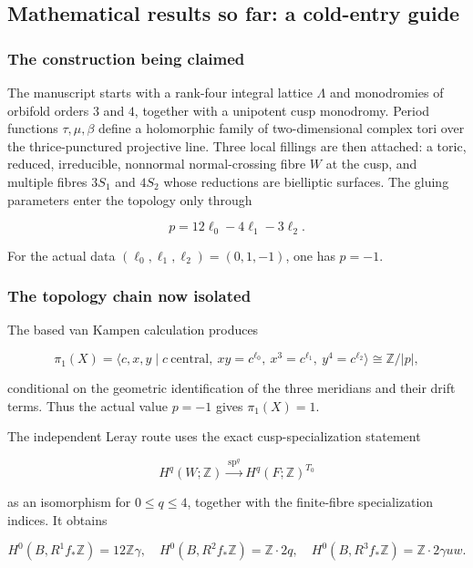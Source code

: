 \documentclass[
  10pt,
  letterpaper,
]{article}
\begin{document}
\subsection{Mathematical results so far: a cold-entry
guide}\label{mathematical-results-so-far-a-cold-entry-guide}

\subsubsection{The construction being
claimed}\label{the-construction-being-claimed}

The manuscript starts with a rank-four integral lattice \(\Lambda\) and
monodromies of orbifold orders \(3\) and \(4\), together with a
unipotent cusp monodromy. Period functions \(\tau,\mu,\beta\) define a
holomorphic family of two-dimensional complex tori over the
thrice-punctured projective line. Three local fillings are then
attached: a toric, reduced, irreducible, nonnormal normal-crossing fibre
\(W\) at the cusp, and multiple fibres \(3S_1\) and \(4S_2\) whose
reductions are bielliptic surfaces. The gluing parameters enter the
topology only through

\[
p=12\ell_0-4\ell_1-3\ell_2.
\]

For the actual data \((\ell_0,\ell_1,\ell_2)=(0,1,-1)\), one has
\(p=-1\).

\subsubsection{The topology chain now
isolated}\label{the-topology-chain-now-isolated}

The based van Kampen calculation produces

\[
\pi_1(X)=\langle c,x,y\mid c\ \text{central},\ xy=c^{\ell_0},\ x^3=c^{\ell_1},\ y^4=c^{\ell_2}\rangle
\cong \mathbb Z/|p|,
\]

conditional on the geometric identification of the three meridians and
their drift terms. Thus the actual value \(p=-1\) gives \(\pi_1(X)=1\).

The independent Leray route uses the exact cusp-specialization statement

\[
H^q(W;\mathbb Z)\xrightarrow{\ \operatorname{sp}^q\ }
H^q(F;\mathbb Z)^{T_0}
\]

as an isomorphism for \(0\le q\le4\), together with the finite-fibre
specialization indices. It obtains

\[
H^0(B,R^1f_*\mathbb Z)=12\mathbb Z\gamma,
\quad
H^0(B,R^2f_*\mathbb Z)=\mathbb Z\cdot2q,
\quad
H^0(B,R^3f_*\mathbb Z)=\mathbb Z\cdot2\gamma uw.
\]
\end{document}
